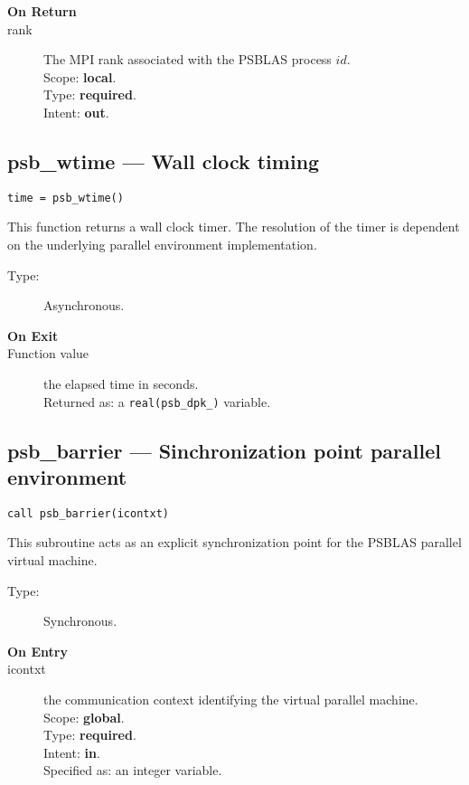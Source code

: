 \begin{description}
\item[\bf On Return]
\item[rank] The MPI rank associated with the  PSBLAS process $id$.\\
Scope: {\bf local}.\\
Type: {\bf required}.\\
Intent: {\bf out}.\\
\end{description}




\clearpage\subsection*{psb\_wtime --- Wall clock timing}

\begin{verbatim}
time = psb_wtime()
\end{verbatim}

This function returns a wall clock timer. The resolution of the timer
is dependent on the underlying parallel environment implementation.
\begin{description}
\item[Type:] Asynchronous.
\item[\bf  On Exit ]
\item[Function value] the elapsed time in seconds.\\
Returned  as: a  \verb|real(psb_dpk_)|  variable.
\end{description}


\clearpage\subsection*{psb\_barrier --- Sinchronization point  parallel
  environment}

\begin{verbatim}
call psb_barrier(icontxt)
\end{verbatim}

This subroutine acts as an explicit synchronization point for  the  PSBLAS
parallel virtual  machine. 
\begin{description}
\item[Type:] Synchronous.
\item[\bf  On Entry ]
\item[icontxt] the communication context identifying the virtual
  parallel machine.\\
Scope: {\bf global}.\\
Type: {\bf required}.\\
Intent: {\bf in}.\\
Specified as: an integer variable.
\end{description}


